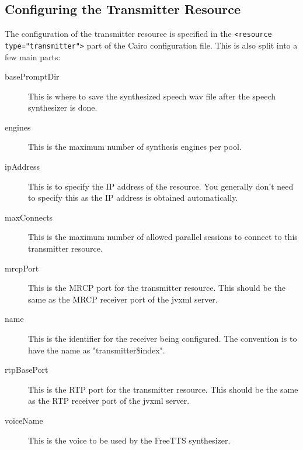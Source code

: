 \subsection{Configuring the Transmitter Resource}
The configuration of the transmitter resource is specified in the \lstinline$<resource type="transmitter">$ part of the Cairo configuration file.
This is also split into a few main parts:
\begin{description}
  \item[basePromptDir] This is where to save the synthesized speech wav file after the speech synthesizer is done. 
  \item[engines] This is the maximum number of synthesis engines per pool.
  \item[ipAddress] This is to specify the IP address of the resource. You generally don't need to specify this as the IP address is obtained automatically.
  \item[maxConnects] This is the maximum number of allowed parallel sessions to connect to this transmitter resource.
  \item[mrcpPort] This is the MRCP port for the transmitter resource. This should be the same as the MRCP receiver port of the \ac{jvxml} server.
  \item[name] This is the identifier for the receiver being configured. The convention is to have the name as "transmitter\$index".
  \item[rtpBasePort] This is the RTP port for the transmitter resource. This should be the same as the RTP receiver port of the \ac{jvxml} server.
  \item[voiceName] This is the voice to be used by the FreeTTS synthesizer.
\end{description}

